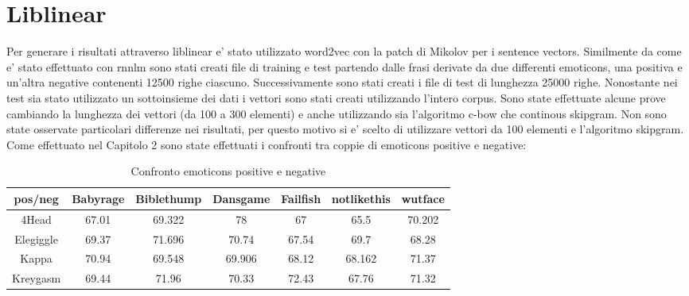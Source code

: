\documentclass[a4paper,11pt]{book}
\theoremstyle{definition}
\begin{document}
\chapter{Liblinear}
\label{ch:liblinear}
Per generare i risultati attraverso liblinear e' stato utilizzato word2vec con la patch di Mikolov per i sentence vectors. Similmente da come e' stato effettuato con rnnlm sono stati creati file di training e test partendo dalle frasi derivate da due differenti emoticons, una positiva e un'altra negative contenenti 12500 righe ciascuno. Successivamente sono stati creati i file di test di lunghezza 25000 righe. Nonostante nei test sia stato utilizzato un sottoinsieme dei dati i vettori sono stati creati utilizzando l'intero corpus.
Sono state effettuate alcune prove cambiando la lunghezza dei vettori (da 100 a 300 elementi) e anche utilizzando sia l'algoritmo c-bow che continous skipgram. Non sono state osservate particolari differenze nei risultati, per questo motivo si e' scelto di utilizzare vettori da 100 elementi e l'algoritmo skipgram.
Come effettuato nel Capitolo 2 sono state effettuati i confronti tra coppie di emoticons positive e negative:

\begin{table}[h]
\begin{center}
\begin{tabular}{|c|c|c|c|c|c|c|}
\hline
pos/neg & Babyrage & Biblethump & Dansgame & Failfish & notlikethis & wutface \\
\hline
\hline
4Head & 67.01 &  69.322 & 78 & 67 & 65.5 & 70.202 \\
\hline
Elegiggle & 69.37 & 71.696 & 70.74 & 67.54 & 69.7 & 68.28 \\
\hline
Kappa & 70.94 & 69.548 & 69.906 & 68.12 & 68.162 & 71.37 \\
\hline
Kreygasm & 69.44 & 71.96 & 70.33 & 72.43 & 67.76 & 71.32 \\
\hline
\end{tabular}
\end{center}
\caption{Confronto emoticons positive e negative}
\label{tab:liblinearTest1}
\end{table}
\end{document}
